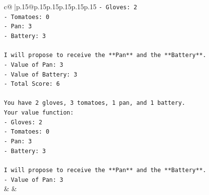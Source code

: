 \documentclass{article}
\begin{document}
{\begin{supertabular}{c@{$\;$}|p{.15\linewidth}@{}p{.15\linewidth}p{.15\linewidth}p{.15\linewidth}p{.15\linewidth}p{.15\linewidth}}
{{{\texttt{{-} Gloves: 2} \\
\texttt{{-} Tomatoes: 0} \\
\texttt{{-} Pan: 3} \\
\texttt{{-} Battery: 3} \\
\\ 
\texttt{I will propose to receive the **Pan** and the **Battery**.} \\
\texttt{{-} Value of Pan: 3} \\
\texttt{{-} Value of Battery: 3} \\
\texttt{{-} Total Score: 6} \\
\\ 
\texttt{You have 2 gloves, 3 tomatoes, 1 pan, and 1 battery.} \\
\texttt{Your value function:} \\
\texttt{{-} Gloves: 2} \\
\texttt{{-} Tomatoes: 0} \\
\texttt{{-} Pan: 3} \\
\texttt{{-} Battery: 3} \\
\\ 
\texttt{I will propose to receive the **Pan** and the **Battery**.} \\
\texttt{{-} Value of Pan: 3} \\
            }
        }
    }
    & & \\ \\


\end{supertabular}}
\end{document}

